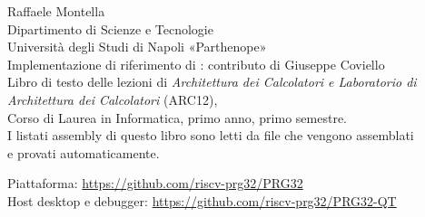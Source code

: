 \begin{titlepage}
\vfill

\begin{flushleft}
{\sffamily\Large\color{prgink} Raffaele Montella}\\[4pt]
{\sffamily\normalsize\color{prgink}
Dipartimento di Scienze e Tecnologie\\
Università degli Studi di Napoli «Parthenope»}\\[14pt]
{\sffamily\normalsize\color{prgsteel}
Implementazione di riferimento di \vermone: contributo di Giuseppe Coviello}\\[14pt]
{\small Libro di testo delle lezioni di \emph{Architettura dei Calcolatori e Laboratorio
di Architettura dei Calcolatori} (ARC12),\\ Corso di Laurea in Informatica,
primo anno, primo semestre.\\[6pt]
I listati assembly di questo libro sono letti da file che vengono assemblati\\ e provati automaticamente.}
\end{flushleft}

\vspace{1.2cm}
{\footnotesize\color{prgcomment} Piattaforma: \url{https://github.com/riscv-prg32/PRG32}\\
Host desktop e debugger: \url{https://github.com/riscv-prg32/PRG32-QT}}
\end{titlepage}
